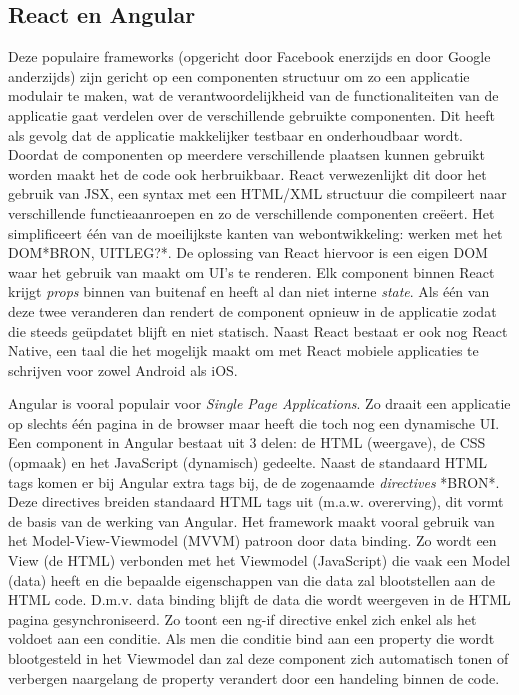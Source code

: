 \subsection{React en Angular}
Deze populaire frameworks (opgericht door Facebook enerzijds en door Google anderzijds) zijn gericht op een componenten structuur om zo een applicatie modulair te maken, wat de verantwoordelijkheid van de functionaliteiten van de applicatie gaat verdelen over de verschillende gebruikte componenten. Dit heeft als gevolg dat de applicatie makkelijker testbaar en onderhoudbaar wordt. Doordat de componenten op meerdere verschillende plaatsen kunnen gebruikt worden maakt het de code ook herbruikbaar. React verwezenlijkt dit door het gebruik van JSX, een syntax met een HTML/XML structuur die compileert naar verschillende functieaanroepen en zo de verschillende componenten creëert. Het simplificeert één van de moeilijkste kanten van webontwikkeling: werken met het DOM*BRON, UITLEG?*. De oplossing van React hiervoor is een eigen DOM waar het gebruik van maakt om UI's te renderen. Elk component binnen React krijgt \textit{props} binnen van buitenaf en heeft al dan niet interne \textit{state}. Als één van deze twee veranderen dan rendert de component opnieuw in de applicatie zodat die steeds geüpdatet blijft en niet statisch. Naast React bestaat er ook nog React Native, een taal die het mogelijk maakt om met React mobiele applicaties te schrijven voor zowel Android als iOS.

Angular is vooral populair voor \textit{Single Page Applications}. Zo draait een applicatie op slechts één pagina in de browser maar heeft die toch nog een dynamische UI. Een component in Angular bestaat uit 3 delen: de HTML (weergave), de CSS (opmaak) en het JavaScript (dynamisch) gedeelte. Naast de standaard HTML tags komen er bij Angular extra tags bij, de de zogenaamde \textit{directives} *BRON*. Deze directives breiden standaard HTML tags uit (m.a.w. overerving), dit vormt de basis van de werking van Angular. Het framework maakt vooral gebruik van het Model-View-Viewmodel (MVVM) patroon door data binding. Zo wordt een View (de HTML) verbonden met het Viewmodel (JavaScript) die vaak een Model (data) heeft en die bepaalde eigenschappen van die data zal blootstellen aan de HTML code. D.m.v. data binding blijft de data die wordt weergeven in de HTML pagina gesynchroniseerd. Zo toont een ng-if directive enkel zich enkel als het voldoet aan een conditie. Als men die conditie bind aan een property die wordt blootgesteld in het Viewmodel dan zal deze component zich automatisch tonen of verbergen naargelang de property verandert door een handeling binnen de code.  

